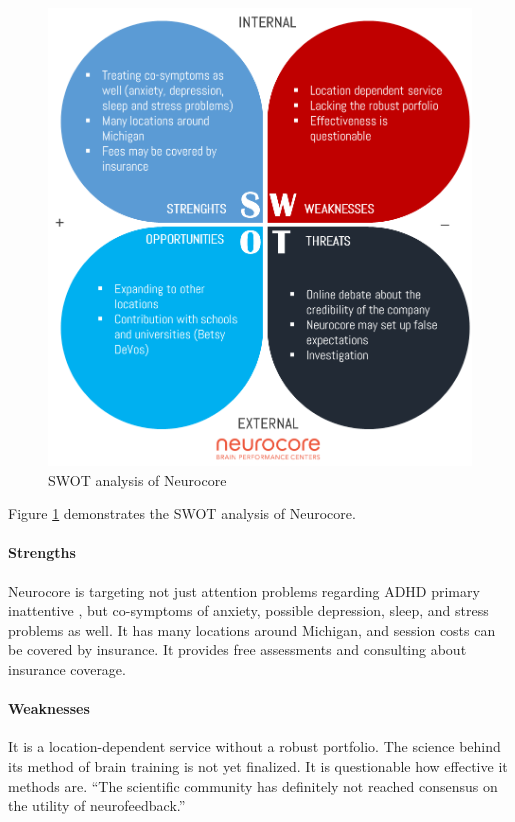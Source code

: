 \documentclass[letterpaper,10pt]{article}
\begin{document}
\begin{figure}[h]
\centering
\includegraphics[scale=0.4]{neurocore_swot.PNG}
\caption{SWOT analysis of Neurocore}
\label{img:neurocoreswot}
\end{figure}

Figure \ref{img:neurocoreswot} demonstrates the SWOT analysis of Neurocore.

\paragraph{Strengths}

Neurocore is targeting not just attention problems regarding ADHD primary inattentive , but co-symptoms of anxiety, possible depression, sleep, and stress problems as well. It  has many locations around Michigan, and session costs can be covered by insurance. It provides free assessments and consulting about insurance coverage.

\paragraph{Weaknesses}

It is a location-dependent service without a robust portfolio. The science behind its method of brain training is not yet finalized. It is questionable how effective it methods are. “The scientific community has definitely not reached consensus on the utility of neurofeedback.”
\end{document}
